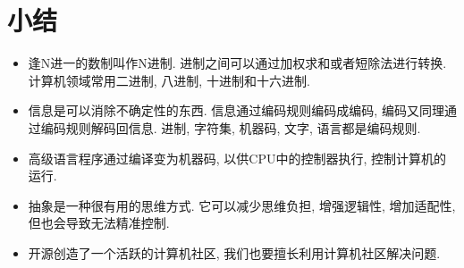     \sumrule
    \section*{小结}
        \begin{itemize}
            \item 逢N进一的数制叫作N进制. 进制之间可以通过加权求和或者短除法进行转换. 计算机领域常用二进制, 八进制, 十进制和十六进制.
            \item 信息是可以消除不确定性的东西. 信息通过编码规则编码成编码, 编码又同理通过编码规则解码回信息. 进制, 字符集, 机器码, 文字, 语言都是编码规则.
            \item 高级语言程序通过编译变为机器码, 以供CPU中的控制器执行, 控制计算机的运行.
            \item 抽象是一种很有用的思维方式. 它可以减少思维负担, 增强逻辑性, 增加适配性, 但也会导致无法精准控制.
            \item 开源创造了一个活跃的计算机社区, 我们也要擅长利用计算机社区解决问题.
        \end{itemize}